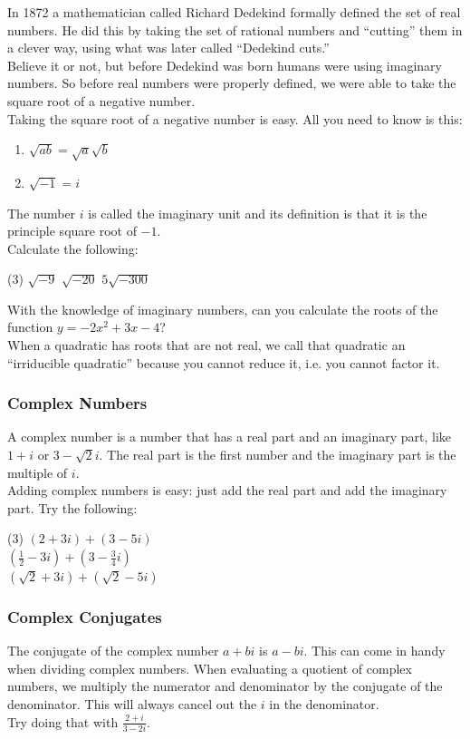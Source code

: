 \documentclass[12pt,fleqn]{book}
\begin{document}
In 1872 a mathematician called Richard Dedekind formally defined the set of real numbers.  He did this by taking the set of rational numbers and ``cutting'' them in a clever way, using what was later called ``Dedekind cuts.''
\\[1em]
Believe it or not, but before Dedekind was born humans were using imaginary numbers.  So before real numbers were properly defined, we were able to take the square root of a negative number.
\\[3em]
Taking the square root of a negative number is easy.  All you need to know is this:
\begin{enumerate}
	\item $\sqrt{ab}=\sqrt a \sqrt b$
	\item $\sqrt{-1}=i$
\end{enumerate}
The number $i$ is called the imaginary unit and its definition is that it is the principle square root of $-1$.
\\[1em]
Calculate the following:
\begin{tasks}(3)
	\task $\sqrt{-9}$
	\task $\sqrt{-20}$
	\task $5\sqrt{-300}$
\end{tasks}
\clearpage
With the knowledge of imaginary numbers, can you calculate the roots of the function $y=-2x^{2}+3x-4$?
\\[4em]
When a quadratic has roots that are not real, we call that quadratic an ``irriducible quadratic'' because you cannot reduce it, i.e. you cannot factor it.
\subsubsection*{Complex Numbers}
A complex number is a number that has a real part and an imaginary part, like $1+i$ or $3-\sqrt2 i$.  The real part is the first number and the imaginary part is the multiple of $i$.  \\[1em]
Adding complex numbers is easy: just add the real part and add the imaginary part.  Try the following:
\begin{tasks}(3)
	\task $\left(2+3i\right) + \left(3-5i\right)$\\[2em]
	\task $\left(\frac 12-3i\right) + \left(3-\frac 34i\right)$\\[2em]
	\task $\left(\sqrt 2+3i\right) + \left(\sqrt 2-5i\right)$\\[2em]
\end{tasks}
\subsubsection*{Complex Conjugates}
The conjugate of the complex number $a+bi$ is $a-bi$.  This can come in handy when dividing complex numbers.  When evaluating a quotient of complex numbers, we multiply the numerator and denominator by the conjugate of the denominator.  This will always cancel out the $i$ in the denominator.
\\[1em]
Try doing that with $\displaystyle \frac{2+i}{3-2i}$.
\\[4em]
\end{document}
